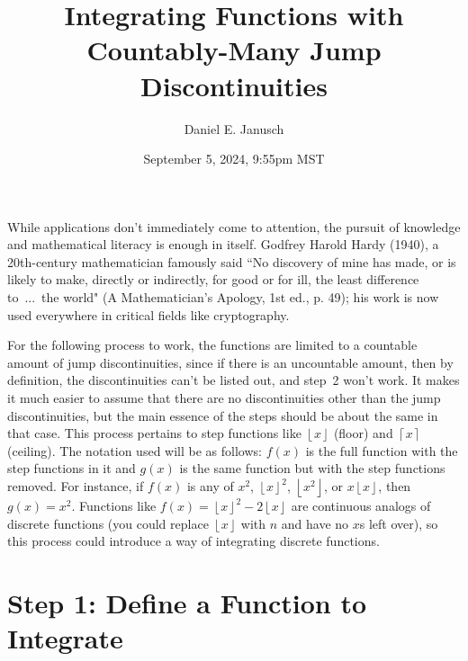 \documentclass[12pt]{article}
\newcommand \floor [1]{\left\lfloor #1 \right\rfloor}
\newcommand \ceil [1]{ \left\lceil  #1 \right\rceil}
\begin{document}
{}

\title{Integrating Functions with Countably-Many Jump Discontinuities}
\author{Daniel E. Janusch}
\date{September 5, 2024, 9:55pm MST}
\maketitle

	\indent While applications don't immediately come to attention, the pursuit of knowledge and
	mathematical literacy is enough in itself. Godfrey Harold Hardy (1940), a 20th-century
	mathematician famously said ``No discovery of mine has made, or is likely to make, directly
	or indirectly, for good or for ill, the least difference to~...~the world" (A Mathematician's
	Apology, 1st ed., p. 49); his work is now used everywhere in critical fields like
	cryptography.

	\indent For the following process to work, the functions are limited to a countable amount of
	jump discontinuities, since if there is an uncountable amount, then by definition, the
	discontinuities can't be listed out, and step~2 won't work. It makes it much easier to assume
	that there are no discontinuities other than the jump discontinuities, but the main essence of
	the steps should be about the same in that case. This process pertains to step functions like
	$\floor x$ (floor) and $\ceil x$ (ceiling). The notation used will be as follows: $f(x)$ is
	the full function with the step functions in it and  $g(x)$ is the same function but with the
	step functions removed. For instance, if $f(x)$ is any of $x^2$, $\floor{x}^2$, $\floor{x^2}$,
	or $x\floor x$, then $g(x) = x^2$. Functions like $f(x) = \floor{x}^2 - 2\floor x$ are
	continuous analogs of discrete functions (you could replace $\floor x$ with $n$ and have no
	$x$s left over), so this process could introduce a way of integrating discrete functions.

{}
\section*{Step 1: Define a Function to Integrate}
\end{document}
